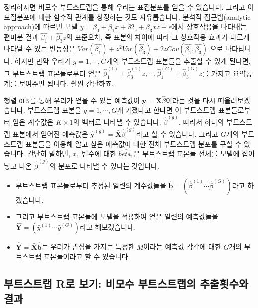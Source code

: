 \documentclass[
]{book}
\begin{document}
정리하자면 비모수 부트스트랩을 통해 우리는 표집분포를 얻을 수 있습니다. 그리고 이 표집분포에 대한 함수적 관계를 상정하는 것도 자유롭습니다. 분석적 접근법(analytic approach)에 따르면 모델 \(y = \beta_0 + \beta_1x + \beta2_z + \beta_3xz + \epsilon\)에서 상호작용을 나타내는 편미분 결과 \(\hat{\beta_1} + \hat{\beta_3}z\)의 표준오차, 즉 표본의 차이에 따라 그 상호작용 효과가 다르게 나타날 수 있는 변동성은 \(Var(\hat{\beta_1}) + z^2Var(\hat{\beta_3}) + 2z Cov(\hat{\beta_1}, \hat{\beta_3})\) 으로 나타납니다. 하지만 만약 우리가 \(g = 1, \cdots, G\)개의 부트스트랩 표본들을 추출할 수 있게 된다면, 그 부트스트랩 표본들로부터 얻은 \(\hat{\beta}_1^{(1)} + \hat{\beta}_3^{(1)}z, \cdots, \hat{\beta}_1^{(G)} + \hat{\beta}_3^{(G)}z\)를 가지고 요약통계를 보여주면 됩니다. 훨씬 간단하죠.

행렬 \texttt{OLS}를 통해 우리가 얻을 수 있는 예측값이 \(\hat{\textbf{y}} = \bar{\textbf{X}}\hat{\beta}\)이라는 것을 다시 떠올려보겠습니다. 부트스트랩 표본을 \(g=1,\cdots,G\)개 가졌다고 한다면 이 부트스트랩 표본들로부터 얻은 계수값은 \(K\times1\)의 벡터로 나타낼 수 있습니다: \(\hat{\beta}^{(g)}\). 따라서 하나의 부트스트랩 표본에서 얻어진 예측값은 \(\hat{\textbf{y}}^{(g)} = \bar{\textbf{X}}\hat{\beta}^{(g)}\)라고 할 수 있습니다. 그리고 \(G\)개의 부트스트랩 표본들을 이용해 알고 싶은 예측값에 대한 전체 부트스트랩 분포를 구할 수 있습니다. 간단히 말하면, \(x_1\) 변수에 대한 \(\hat{beta_1}\)은 부트스트랩 표본들 전체를 모델에 집어넣고 나온 \(\hat{\beta}^{(g)}\)의 분포로 나타낼 수 있다는 것입니다.

\begin{itemize}
\item
  부트스트랩 표본들로부터 추정된 일련의 계수값들을 \(\hat{\textbf{b}} = (\hat{\beta}^{(1)} \cdots \hat{\beta}^{(G)})\)라고 하겠습니다.
\item
  그리고 부트스트랩 표본들에 모델을 적용하여 얻은 일련의 예측값들을 \(\hat{\textbf{Y}} = (\hat{y}^{(1)} \cdots \hat{y}^{(G)})\)라고 해보겠습니다.
\item
  \(\hat{\textbf{Y}} = \bar{\textbf{X}}\hat{\textbf{b}}\)는 우리가 관심을 가지는 특정한 \(M\)이라는 예측값 각각에 대한 \(G\)개의 부트스트랩 표본들이라고 할 수 있습니다.
\end{itemize}

\hypertarget{uxbd80uxd2b8uxc2a4uxd2b8uxb7a9-ruxb85c-uxbcf4uxae30-uxbe44uxbaa8uxc218-uxbd80uxd2b8uxc2a4uxd2b8uxb7a9uxc758-uxcd94uxcd9cuxd69fuxc218uxc640-uxacb0uxacfc}{%
\subsection{부트스트랩 R로 보기: 비모수 부트스트랩의 추출횟수와 결과}\label{uxbd80uxd2b8uxc2a4uxd2b8uxb7a9-ruxb85c-uxbcf4uxae30-uxbe44uxbaa8uxc218-uxbd80uxd2b8uxc2a4uxd2b8uxb7a9uxc758-uxcd94uxcd9cuxd69fuxc218uxc640-uxacb0uxacfc}}
\end{document}
